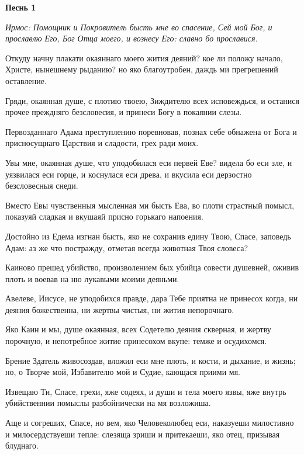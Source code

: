 \bigskip\bigskip\mychapterending

 
\bfseries Песнь 1\normalfont{}


\itshape Ирмос\normalfont{}: Помощник и Покровитель бысть мне во спасение, Сей мой Бог, и прославлю Его, Бог Отца моего, и вознесу Его: славно бо прославися.


Откуду начну плакати окаяннаго моего жития деяний? кое ли положу начало, Христе, нынешнему рыданию? но яко благоутробен, даждь ми прегрешений оставление.


Гряди, окаянная душе, с плотию твоею, Зиждителю всех исповеждься, и останися прочее преждняго безсловесия, и принеси Богу в покаянии слезы.


Первозданнаго Адама преступлению поревновав, познах себе обнажена от Бога и присносущнаго Царствия и сладости, грех ради моих.


Увы мне, окаянная душе, что уподобилася еси первей Еве? видела бо еси зле, и уязвилася еси горце, и коснулася еси древа, и вкусила еси дерзостно безсловесныя снеди.


Вместо Евы чувственныя мысленная ми бысть Ева, во плоти страстный помысл, показуяй сладкая и вкушаяй присно горькаго напоения.


Достойно из Едема изгнан бысть, яко не сохранив едину Твою, Спасе, заповедь Адам: аз же что постражду, отметая всегда животная Твоя словеса?


Каиново прешед убийство, произволением бых убийца совести душевней, оживив плоть и воевав на ню лукавыми моими деяньми.


Авелеве, Иисусе, не уподобихся правде, дара Тебе приятна не принесох когда, ни деяния божественна, ни жертвы чистыя, ни жития непорочнаго.


Яко Каин и мы, душе окаянная, всех Содетелю деяния скверная, и жертву порочную, и непотребное житие принесохом вкупе: темже и осудихомся.


Брение Здатель живосоздав, вложил еси мне плоть, и кости, и дыхание, и жизнь; но, о Творче мой, Избавителю мой и Судие, кающася приими мя.


Извещаю Ти, Спасе, грехи, яже содеях, и души и тела моего язвы, яже внутрь убийственнии помыслы разбойнически на мя возложиша.


Аще и согреших, Спасе, но вем, яко Человеколюбец еси, наказуеши милостивно и милосердствуеши тепле: слезяща зриши и притекаеши, яко отец, призывая блуднаго.



